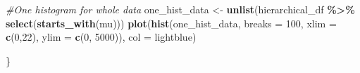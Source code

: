 \documentclass[
]{article}
\newenvironment{Shaded}{\begin{snugshade}}{\end{snugshade}}
\newcommand{\CommentTok}[1]{\textcolor[rgb]{0.56,0.35,0.01}{\textit{#1}}}
\newcommand{\DataTypeTok}[1]{\textcolor[rgb]{0.13,0.29,0.53}{#1}}
\newcommand{\DecValTok}[1]{\textcolor[rgb]{0.00,0.00,0.81}{#1}}
\newcommand{\KeywordTok}[1]{\textcolor[rgb]{0.13,0.29,0.53}{\textbf{#1}}}
\newcommand{\NormalTok}[1]{#1}
\newcommand{\OperatorTok}[1]{\textcolor[rgb]{0.81,0.36,0.00}{\textbf{#1}}}
\newcommand{\StringTok}[1]{\textcolor[rgb]{0.31,0.60,0.02}{#1}}
\begin{document}
\begin{Shaded}
\begin{Highlighting}[]
  \CommentTok{\#One histogram for whole data}
\NormalTok{  one\_hist\_data \textless{}{-}}\StringTok{ }\KeywordTok{unlist}\NormalTok{(hierarchical\_df }\OperatorTok{\%\textgreater{}\%}\StringTok{ }\KeywordTok{select}\NormalTok{(}\KeywordTok{starts\_with}\NormalTok{(}\StringTok{\textquotesingle{}mu\textquotesingle{}}\NormalTok{)))}
  \KeywordTok{plot}\NormalTok{(}\KeywordTok{hist}\NormalTok{(one\_hist\_data, }\DataTypeTok{breaks =} \DecValTok{100}\NormalTok{, }\DataTypeTok{xlim =} \KeywordTok{c}\NormalTok{(}\DecValTok{0}\NormalTok{,}\DecValTok{22}\NormalTok{), }\DataTypeTok{ylim =} \KeywordTok{c}\NormalTok{(}\DecValTok{0}\NormalTok{, }\DecValTok{5000}\NormalTok{)),}
            \DataTypeTok{col =} \StringTok{\textquotesingle{}lightblue\textquotesingle{}}\NormalTok{)}

\NormalTok{\}}
\end{Highlighting}
\end{Shaded}
\end{document}
